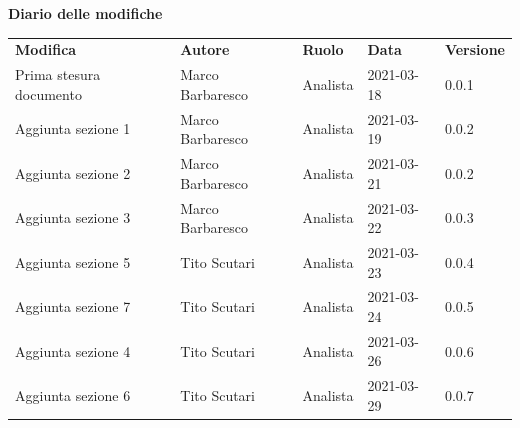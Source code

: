 \documentclass[a4paper]{article}
\begin{document}
    \begin{center}
        \textbf{\Large Diario delle modifiche}\\
        \vspace{10px}
        \begin{table}[h!]
        \centering
        \renewcommand{\arraystretch}{1.8}
        \begin{tabular}{p{150px} p{90px} p{50px} p{60px} p{45px}}
            \rowcolor{logo!70} \textbf{Modifica} & \textbf{Autore} & \textbf{Ruolo} & \textbf{Data} & \textbf{Versione}\\
            Prima stesura documento & Marco Barbaresco & Analista & 2021-03-18 & 0.0.1 \\
            Aggiunta sezione 1 & Marco Barbaresco & Analista & 2021-03-19 & 0.0.2 \\
            Aggiunta sezione 2 & Marco Barbaresco & Analista & 2021-03-21 & 0.0.2 \\
            Aggiunta sezione 3 & Marco Barbaresco & Analista & 2021-03-22 & 0.0.3 \\
            Aggiunta sezione 5 & Tito Scutari     & Analista & 2021-03-23 & 0.0.4 \\
            Aggiunta sezione 7 & Tito Scutari     & Analista & 2021-03-24 & 0.0.5 \\
            Aggiunta sezione 4 & Tito Scutari     & Analista & 2021-03-26 & 0.0.6 \\
            Aggiunta sezione 6 & Tito Scutari     & Analista & 2021-03-29 & 0.0.7 \\

        \end{tabular}
    \end{table}
    \end{center}

    \newpage
    \tableofcontents
    \newpage
    \newpage
    \listoftables
    \newpage
    
    
    
    
    
    
    
 
\end{document}
